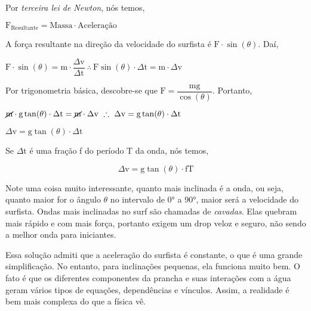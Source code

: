 \documentclass[book, 12pt, twoside, a5paper, english, brazil, sumario=tradicional, openany]{abntex2}
\begin{document}
Por \textit{terceira lei de Newton}, nós temos, 

\begin{center}
    $\text{F}_{\text{Resultante}} = \text{Massa} \cdot \text{Aceleração}$
\end{center}

A força resultante na direção da velocidade do surfista é $\text{F} \cdot \sin(\theta)$. Daí, 

\begin{center}
    $\text{F} \cdot \sin(\theta) = \text{m} \cdot \dfrac{\Delta\text{v}}{\Delta\text{t}} \ \therefore \  \text{F}\sin(\theta) \cdot \Delta\text{t} = \text{m} \cdot \Delta\text{v}$
\end{center}

Por trigonometria básica, descobre-se que $\text{F} = \dfrac{\text{mg}}{\cos(\theta)}$. Portanto, 

\begin{center}
    $  \cancel{\text{m}} \cdot \text{g}\tan(\theta) \cdot \Delta\text{t} = \cancel{\text{m}} \cdot \Delta\text{v} \ \therefore \ \Delta\text{v} = \text{g}\tan(\theta) \cdot \Delta\text{t}$
\end{center}

\begin{center}
    $ \Delta\text{v} = \text{g}\tan(\theta) \cdot \Delta\text{t}$
\end{center}

Se $\Delta\text{t}$ é uma fração f do período T da onda, nós temos, 

\begin{equation}
     \Delta\text{v} = \text{g}\tan(\theta) \cdot \text{f} \text{T}
\end{equation}

Note uma coisa muito interessante, quanto mais inclinada é a onda, ou seja, quanto maior for o ângulo $\theta$ no intervalo de 0° a 90°, maior será a velocidade do surfista. Ondas mais inclinadas no surf são chamadas de \textit{cavadas}. Elas quebram mais rápido e com mais força, portanto exigem um drop veloz e seguro, não sendo a melhor onda para iniciantes.

Essa solução admiti que a aceleração do surfista é constante, o que é uma grande simplificação. No entanto, para inclinações pequenas, ela funciona muito bem. O fato é que os diferentes componentes da prancha e suas interações com a água geram vários tipos de equações, dependências e vínculos. Assim, a realidade é bem mais complexa do que a física vê.

\vspace{-0.44cm}
\end{document}
